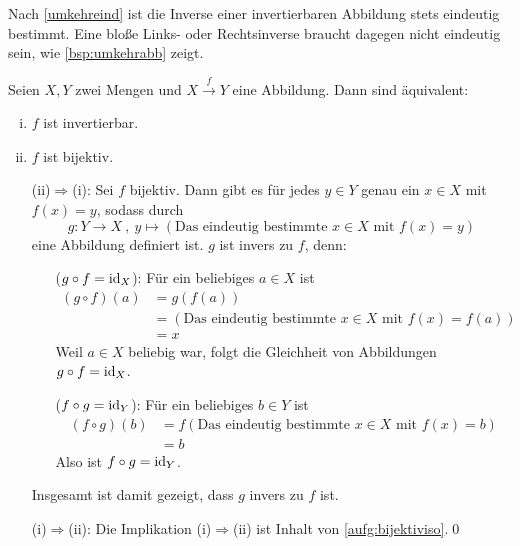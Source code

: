 \begin{bem}
    Nach \cref{umkehreind} ist die Inverse einer invertierbaren Abbildung stets eindeutig bestimmt. Eine bloße Links- oder Rechtsinverse braucht dagegen nicht eindeutig sein, wie \cref{bsp:umkehrabb} zeigt.
\end{bem}


\begin{satz} \label{bijektiviso}
    Seien $X,Y$ zwei Mengen und $X\xrightarrow{f} Y$ eine Abbildung. Dann sind äquivalent:
    \begin{enumerate}[(i)]
        \item $f$ ist invertierbar.
        \item $f$ ist bijektiv.
    \end{enumerate}
\end{satz}


\begin{bew}\quad
    \begin{enumerate}
        \item[(ii)$\Rightarrow$(i):] Sei $f$ bijektiv. Dann gibt es für jedes $y\in Y$ genau ein $x\in X$ mit $f(x)=y$, sodass durch
            \[ g : Y\to X \ ,\ y \mapsto (\text{Das eindeutig bestimmte $x\in X$ mit $f(x)=y$}) \]
        eine Abbildung definiert ist. $g$ ist invers zu $f$, denn:
        \begin{enumerate}
            \item[($g\circ f=\mathrm{id}_X$):] Für ein beliebiges $a\in X$ ist
            \begin{align*}
                (g\circ f)(a) & = g(f(a)) \\
                & = (\text{Das eindeutig bestimmte $x\in X$ mit $f(x)=f(a)$}) \\
                & = x
            \end{align*}
            Weil $a\in X$ beliebig war, folgt die Gleichheit von Abbildungen $g\circ f=\mathrm{id}_X$.
            \item[($f\circ g=\mathrm{id}_Y$):] Für ein beliebiges $b\in Y$ ist
            \begin{align*}
                (f\circ g)(b) & = f(\text{Das eindeutig bestimmte $x\in X$ mit $f(x)=b$}) \\
                & = b
            \end{align*}
            Also ist $f\circ g=\mathrm{id}_Y$. 
        \end{enumerate}
        Insgesamt ist damit gezeigt, dass $g$ invers zu $f$ ist.
        \item[(i)$\Rightarrow$(ii):] Die Implikation (i)$\Rightarrow$(ii) ist Inhalt von \cref{aufg:bijektiviso}.\qed
    \end{enumerate}
\end{bew}


